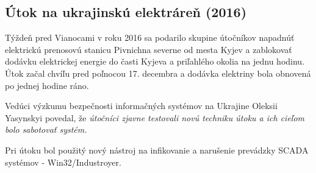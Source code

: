 \subsection{Útok na ukrajinskú elektráreň (2016)}
\tab Týždeň pred Vianocami v roku 2016 sa podarilo skupine útočníkov napadnúť elektrickú prenosovú stanicu Pivnichna severne od mesta Kyjev a zablokovať dodávku elektrickej energie do časti Kyjeva a priľahlého okolia na jednu hodinu. Útok začal chvíľu pred poľnocou 17. decembra a dodávka elektriny bola obnovená po jednej hodine ráno. \par
Vedúci výzkumu bezpečnosti informačných systémov na Ukrajine Oleksii Yasynskyi povedal, že \textit{útočníci zjavne testovali novú techniku útoku a ich cieľom bolo sabotovať systém.} \par
Pri útoku bol použitý nový nástroj na infikovanie a narušenie prevádzky SCADA systémov - Win32/Industroyer\cite{IoTSec}.
